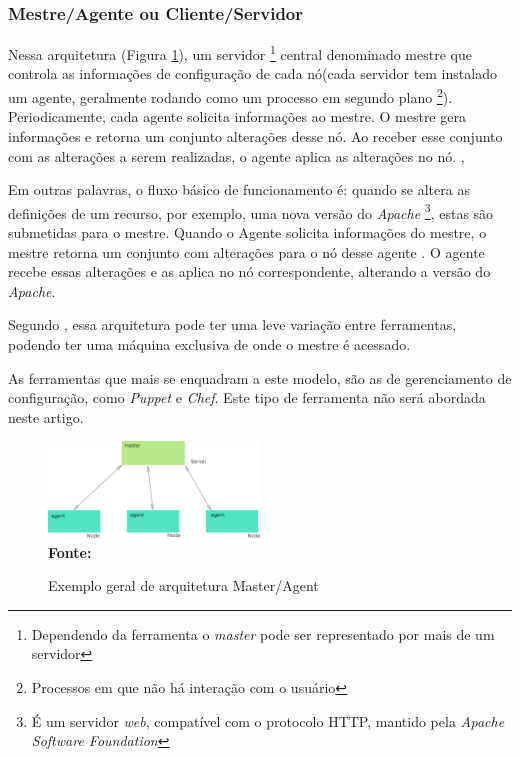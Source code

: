\subsubsection{Mestre/Agente ou Cliente/Servidor} \label{cliente-servidor}
 
  Nessa arquitetura (Figura \ref{fig:figura4}), um servidor \footnote{Dependendo da ferramenta o \textit{master} pode ser representado por mais de um servidor} central denominado mestre que controla as informações de configuração de cada nó(cada servidor tem instalado  um agente, geralmente rodando como um processo em segundo plano \footnote{Processos em que não há interação com o usuário}). Periodicamente, cada agente solicita informações ao mestre. O mestre gera informações e retorna um conjunto alterações desse nó. Ao receber esse conjunto com as alterações a serem realizadas, o agente aplica as alterações no nó. \cite{puppetlabs}, 
 
 Em outras palavras, o fluxo básico de funcionamento é: quando se altera as definições de um recurso, por exemplo, uma nova versão do \textit{Apache} \footnote{É um servidor \textit{web}, compatível com o protocolo HTTP, mantido pela \textit{Apache Software Foundation }}, estas são submetidas para o mestre. Quando o Agente solicita informações do mestre, o mestre retorna um conjunto com alterações para o nó desse agente . O agente recebe essas alterações e as aplica no nó correspondente, alterando a versão do \textit{Apache}.   

Segundo \cite{Morris:2016:ICM:3006361}, essa arquitetura pode ter uma leve variação entre ferramentas, podendo ter uma máquina exclusiva de onde o mestre é acessado.

As ferramentas que mais se enquadram a este modelo, são as de gerenciamento de configuração, como \textit{Puppet} e \textit{Chef}. Este tipo de ferramenta não será abordada neste artigo. 
 
 \begin{figure}[ht]
	\centering	
	\caption[\hspace{0.1cm}Exemplo arquitetura Master/Agent]{Exemplo geral de arquitetura Master/Agent}
	\vspace{-0.4cm}
	\includegraphics[width=0.5\textwidth]{figuras/master-agent.png}
	 \vspace{-0.2cm}
	\\\textbf{\footnotesize Fonte: \cite{Harit}}
	\label{fig:figura4}
\end{figure}
\vspace{-0.5cm}


